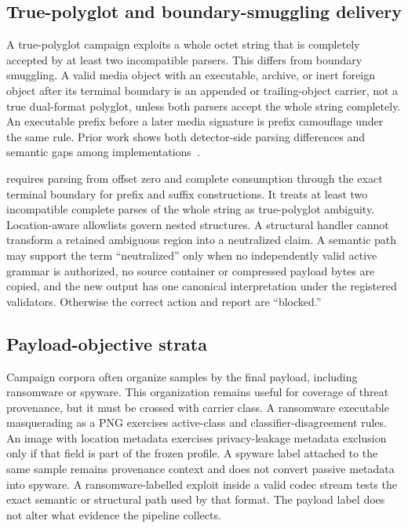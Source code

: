 \subsection{True-polyglot and boundary-smuggling delivery}

A true-polyglot campaign exploits a whole octet string that is completely
accepted by at least two incompatible parsers. This differs from boundary
smuggling. A valid media object with an executable, archive, or inert foreign
object after its terminal boundary is an appended or trailing-object carrier,
not a true dual-format polyglot, unless both parsers accept the whole string
completely. An executable prefix before a later media signature is prefix
camouflage under the same rule. Prior work shows both detector-side parsing
differences and semantic gaps among implementations~\cite{jana2012,koch2025,
you2025}.

\AFD{} requires parsing from offset zero and complete consumption through the
exact terminal boundary for prefix and suffix constructions. It treats at
least two incompatible complete parses of the whole string as true-polyglot
ambiguity. Location-aware allowlists govern nested structures. A structural
handler cannot transform a retained ambiguous region into a neutralized claim.
A semantic path may support the term ``neutralized'' only when no independently
valid active grammar is authorized, no source container or compressed payload
bytes are copied, and the new output has one canonical interpretation under the
registered validators. Otherwise the correct action and report are
``blocked.''

\subsection{Payload-objective strata}

Campaign corpora often organize samples by the final payload, including
ransomware or spyware. This organization remains useful for coverage of threat
provenance, but it must be crossed with carrier class. A ransomware executable
masquerading as a PNG exercises active-class and classifier-disagreement rules.
An image with location metadata exercises privacy-leakage metadata exclusion
only if that field is part of the frozen profile. A spyware label attached to
the same sample remains provenance context and does not convert passive
metadata into spyware. A ransomware-labelled exploit inside a valid codec
stream tests the exact semantic or structural path used by that format. The
payload label does not alter what evidence the pipeline collects.


